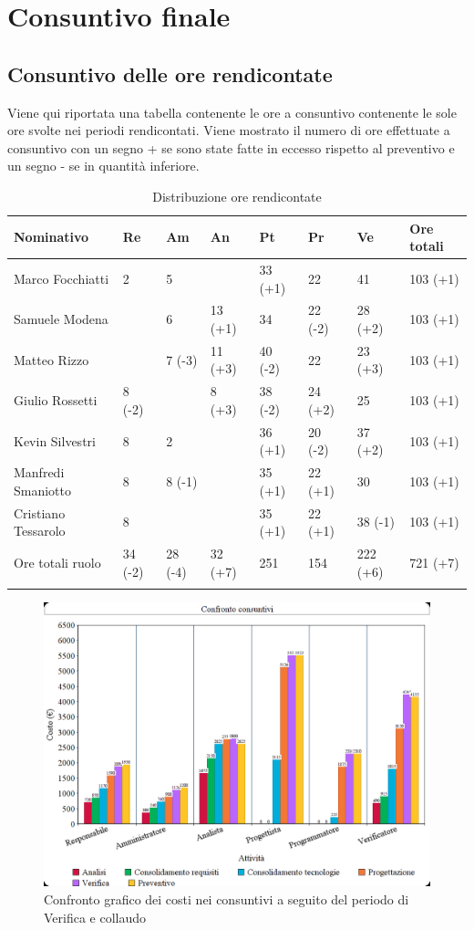 \documentclass[./PianodiProgetto.tex]{subfiles}
\begin{document}
\section{Consuntivo finale}

\subsection{Consuntivo delle ore rendicontate}
Viene qui riportata una tabella contenente le ore a consuntivo contenente le sole ore svolte
nei periodi rendicontati. Viene mostrato il numero di ore effettuate a consuntivo con un
segno + se sono state fatte in eccesso rispetto al preventivo e un segno - se in quantità
inferiore.

\setlength\LTleft{-22mm}
\begin{longtable}{|p{38mm}|p{15mm}|p{15mm}|p{15mm}|p{15mm}|p{15mm}|p{17mm}|p{18mm}|}
		\hline
		Nominativo&Re&Am&An&Pt&Pr&Ve&Ore totali\\ \hline
		Marco Focchiatti&2&5& &33 (+1)&22&41&103 (+1) \\ \hline
		Samuele Modena& &6&13 (+1)&34&22 (-2)&28 (+2)&103 (+1) \\ \hline
		Matteo Rizzo& &7 (-3)&11 (+3)&40 (-2)&22&23 (+3)&103 (+1) \\ \hline
		Giulio Rossetti&8 (-2)& &8 (+3)&38 (-2)&24 (+2)&25&103 (+1) \\ \hline
		Kevin Silvestri&8&2& &36 (+1)&20 (-2)&37 (+2)&103 (+1) \\ \hline
		Manfredi Smaniotto&8&8 (-1)& &35 (+1)&22 (+1)&30&103 (+1) \\ \hline
		Cristiano Tessarolo&8& & &35 (+1)&22 (+1)&38 (-1)&103 (+1) \\  \hline
		Ore totali ruolo&34 (-2)&28 (-4)&32 (+7)&251&154&222 (+6)&721 (+7) \\ \hline
	\caption{Distribuzione ore rendicontate}
\end{longtable}
\begin{figure}[H]
	\centering
	\includegraphics[width=1\linewidth]{img/grafici/CostiConsuntivi/consuntivo-costo-verifica}
	\caption{Confronto grafico dei costi nei consuntivi a seguito del periodo di Verifica e collaudo}
	\label{fig:consuntivo-costi-verifica}
\end{figure}
\end{document}
